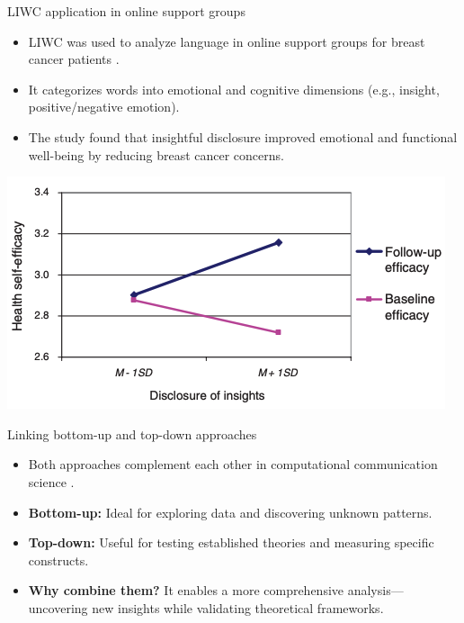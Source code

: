 \documentclass[handout]{beamer}
\begin{document}
\begin{frame}{LIWC application in online support groups}

    \begin{itemize}
        \item LIWC was used to analyze language in online support groups for breast cancer patients \cite{shim2011does}.
        \item It categorizes words into emotional and cognitive dimensions (e.g., insight, positive/negative emotion).
        \item The study found that insightful disclosure improved emotional and functional well-being by reducing breast cancer concerns.
    \end{itemize}

    \begin{center}
        \includegraphics[width=0.8\linewidth]{../pictures/LIWC.png}
    \end{center}

\end{frame}

\begin{frame}{Linking bottom-up and top-down approaches}

    \begin{itemize}
        \item Both approaches complement each other in computational communication science \cite{vanAtteveldt2018}.
        
        \item \textbf{Bottom-up:} Ideal for exploring data and discovering unknown patterns.
        
        \item \textbf{Top-down:} Useful for testing established theories and measuring specific constructs.
        
        \item \textbf{Why combine them?} It enables a more comprehensive analysis—uncovering new insights while validating theoretical frameworks.
    \end{itemize}

    \vspace{0.5cm}

\end{frame}
\end{document}

